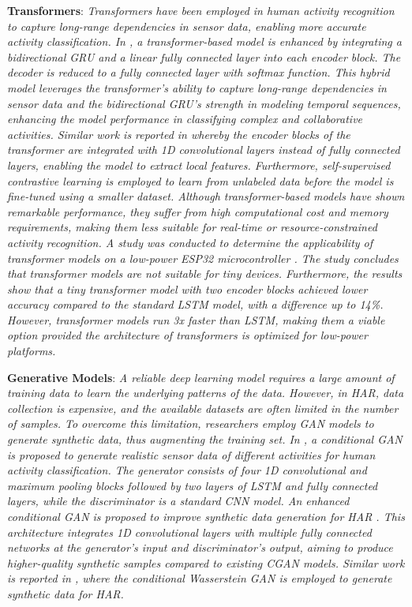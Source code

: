 \documentclass[preprint,12pt]{elsarticle}
\begin{document}
\textbf{Transformers}: \emph{Transformers have been employed in human activity recognition to capture long-range dependencies in sensor data, enabling more accurate activity classification. In \citep{chen_transformer_2022}, a transformer-based model is enhanced by integrating a bidirectional GRU and a linear fully connected layer into each encoder block. The decoder is reduced to a fully connected layer with softmax function. This hybrid model leverages the transformer's ability to capture long-range dependencies in sensor data and the bidirectional GRU's strength in modeling temporal sequences, enhancing the model performance in classifying complex and collaborative activities. Similar work is reported in \citep{sun_efficient_2024} whereby the encoder blocks of the transformer are integrated with 1D convolutional layers instead of fully connected layers, enabling the model to extract local features. Furthermore, self-supervised contrastive learning is employed to learn from unlabeled data before the model is fine-tuned using a smaller dataset. Although transformer-based models have shown remarkable performance, they suffer from high computational cost and memory requirements, making them less suitable for real-time or resource-constrained activity recognition. A study was conducted to determine the applicability of transformer models on a low-power ESP32 microcontroller \citep{lattanzi_are_2025}. The study concludes that transformer models are not suitable for tiny devices. Furthermore, the results show that a tiny transformer model with two encoder blocks achieved lower accuracy compared to the standard LSTM model, with a difference up to 14\%. However, transformer models run 3x faster than LSTM, making them a viable option provided the architecture of transformers is optimized for low-power platforms.}

\textbf{Generative Models}: \emph{A reliable deep learning model requires a large amount of training data to learn the underlying patterns of the data. However, in HAR, data collection is expensive, and the available datasets are often limited in the number of samples. To overcome this limitation, researchers employ GAN models to generate synthetic data, thus augmenting the training set. In \citep{chan_unified_2021}, a conditional GAN is proposed to generate realistic sensor data of different activities for human activity classification. The generator consists of four 1D convolutional and maximum pooling blocks followed by two layers of LSTM and fully connected layers, while the discriminator is a standard CNN model. An enhanced conditional GAN is proposed to improve synthetic data generation for HAR \citep{jimale_fully_2022}. This architecture integrates 1D convolutional layers with multiple fully connected networks at the generator's input and discriminator's output, aiming to produce higher-quality synthetic samples compared to existing CGAN models. Similar work is reported in \citep{lupion_data_2024}, where the conditional Wasserstein GAN is employed to generate synthetic data for HAR. }
\end{document}
